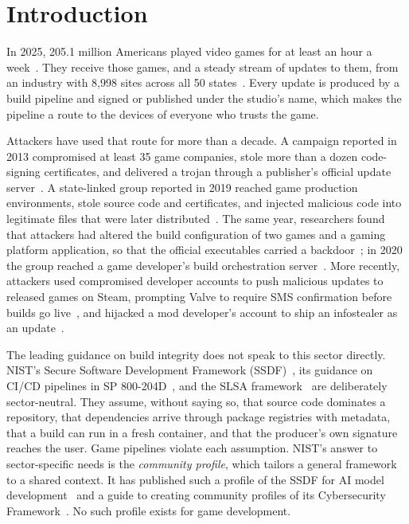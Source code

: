\documentclass[acmsmall,screen,review]{acmart}
\begin{document}

\maketitle

\section{Introduction}\label{sec:1}

In 2025, 205.1 million Americans played video games for at least an hour a week~\cite{entertainment2025annual}. They receive those games, and a steady stream of updates to them, from an industry with 8,998 sites across all 50 states~\cite{grueber2026video}. Every update is produced by a build pipeline and signed or published under the studio's name, which makes the pipeline a route to the devices of everyone who trusts the game.

Attackers have used that route for more than a decade. A campaign reported in 2013 compromised at least 35 game companies, stole more than a dozen code-signing certificates, and delivered a trojan through a publisher's official update server~\cite{kaspersky2013winnti}. A state-linked group reported in 2019 reached game production environments, stole source code and certificates, and injected malicious code into legitimate files that were later distributed~\cite{mandiant2019apt41}. The same year, researchers found that attackers had altered the build configuration of two games and a gaming platform application, so that the official executables carried a backdoor~\cite{eset2019gaming}; in 2020 the group reached a game developer's build orchestration server~\cite{eset2020winnti}. More recently, attackers used compromised developer accounts to push malicious updates to released games on Steam, prompting Valve to require SMS confirmation before builds go live~\cite{toulas2023steam}, and hijacked a mod developer's account to ship an infostealer as an update~\cite{gatlan2023steam}.

The leading guidance on build integrity does not speak to this sector directly. NIST's Secure Software Development Framework (SSDF)~\cite{souppaya2022secure,booth2025secure}, its guidance on CI/CD pipelines in SP 800-204D~\cite{chandramouli2024strategies}, and the SLSA framework~\cite{openndslsa} are deliberately sector-neutral. They assume, without saying so, that source code dominates a repository, that dependencies arrive through package registries with metadata, that a build can run in a fresh container, and that the producer's own signature reaches the user. Game pipelines violate each assumption. NIST's answer to sector-specific needs is the \emph{community profile}, which tailors a general framework to a shared context. It has published such a profile of the SSDF for AI model development~\cite{booth2024secure} and a guide to creating community profiles of its Cybersecurity Framework~\cite{pascoe2024nist}. No such profile exists for game development.
\end{document}
